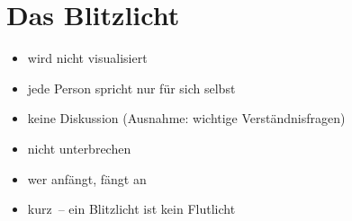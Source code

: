 \section{Das Blitzlicht}

\begin{itemize}
  \item wird nicht visualisiert
  \item jede Person spricht nur für sich selbst
  \item keine Diskussion (Ausnahme: wichtige Verständnisfragen)
  \item nicht unterbrechen
  \item wer anfängt, fängt an
  \item kurz~-- ein Blitzlicht ist kein Flutlicht
\end{itemize}
